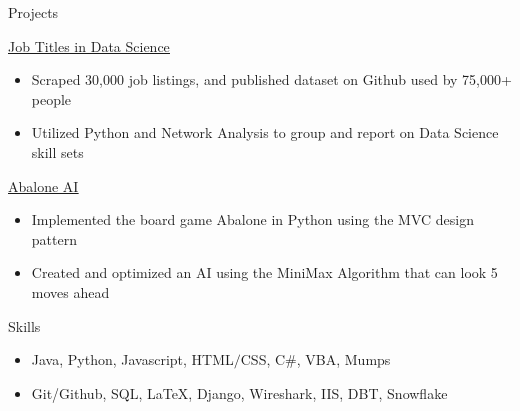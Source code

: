 
	\begin{cvsection}{Projects}
		\begin{cvsubsection}{\href{https://github.com/picklesueat/data_jobs_data}{\underline{Job Titles in Data Science}}}{}{}
			\begin{itemize}
				\item   Scraped 30,000 job listings, and published dataset on Github used by 75,000+ people
				\item Utilized Python and Network Analysis to group and report on Data Science skill sets
			\end{itemize}
		\end{cvsubsection}
		\begin{cvsubsection}{\href{https://github.com/picklesueat/Abalone}{\underline{Abalone AI}}}{}{}
			\begin{itemize}
				\item   Implemented the board game Abalone in Python using the MVC design pattern
				\item Created and optimized an AI using the MiniMax Algorithm that can look 5 moves ahead
			\end{itemize}
		\end{cvsubsection}
	\end{cvsection}
		


\begin{cvsection}{Skills}
	\begin{cvsubsection}{}{}{}	
		\begin{itemize}
			\item Java, Python, Javascript, HTML$/$CSS, C\#, VBA, Mumps
			\item  Git/Github, SQL, LaTeX, Django, Wireshark, IIS, DBT, Snowflake
		\end{itemize}
	\end{cvsubsection}
\end{cvsection}